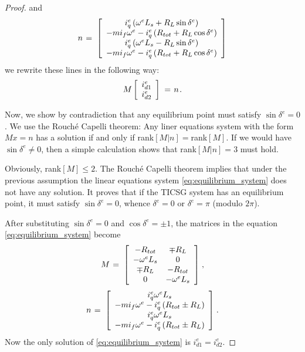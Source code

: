 \documentclass[letterpaper, 10 pt, conference]{ieeeconf}
\renewcommand{\o}    {{\omega}}
\newcommand{\m}      {{\hbox{\hskip 1pt}}}
\begin{document}
\begin{proof}
and 
$$ n \m=\m \left[\begin{array}{c} i_q^e\left(\o^e L_s+R_L\sin\delta^e
   \right)\\ -mi_f\o^e-i_q^e\left(R_{tot}+R_L\cos\delta^e\right)\\
   i_q^e\left(\o^e L_s-R_L\sin\delta^e\right)\\ -mi_f\o^e-i_q^e\left(
   R_{tot}+R_L\cos\delta^e\right) \end{array}\right]$$
we rewrite these lines in the following way:
\begin{equation} \label{eq:equilibrium_system}
   M\left[\begin{array}{c} i_{d1}^e\\ i_{d2}^e \end{array}\right]
   \m=\m n \m.
\end{equation}

Now, we show by contradiction that any equilibrium point must satisfy
$\sin\delta^e=0$. We use the Rouch\'e Capelli theorem: Any liner
equations system with the form $Mx=n$ has a solution if and only if
rank$\left[M|n\right]=$rank$\left[M\right]$. If we would have
$\sin\delta^e\neq 0$, then a simple calculation shows that 
rank$\left[M|n\right]=3$ must hold.

Obviously, rank$\left[M\right]\leq 2$. The Rouch\'e Capelli theorem
implies that under the previous assumption the linear equations system
\eqref{eq:equilibrium_system} does not have any solution. It proves
that if the TICSG system has an equilibrium point, it must satisfy
$\sin\delta^{e}=0$, whence $\delta^{e}=0$ or $\delta^e=\pi$
(modulo $2\pi$).

After substituting $\sin\delta^{e}=0$ and $\cos\delta^{e}=\pm 1$, the 
matrices in the equation \eqref{eq:equilibrium_system} become
$$ M \m=\m \left[\begin{array}{cc} -R_{tot} & \mp R_L\\ -\o^e L_s & 
   0\\ \mp R_L & -R_{tot}\\ 0 & -\o^e L_s \end{array}\right] \m,$$
$$ n \m=\m \left[\begin{array}{c} i_q^e\o^e L_s\\ -mi_f\o^e-i_q^e
   \left(R_{tot} \pm R_L\right)\\ i_q^e\o^e L_s\\ -mi_f\o^e-i_q^e
   \left(R_{tot} \pm R_L\right) \end{array}\right] \m.$$
Now the only solution of \eqref{eq:equilibrium_system} is
$i_{d1}^{e}=i_{d2}^{e}$.
\end{proof}
\end{document}
